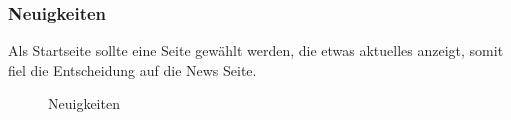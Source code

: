 \newpage
\FloatBarrier
\subsubsection{Neuigkeiten}\label{mockup_news}
Als Startseite sollte eine Seite gewählt werden, die etwas aktuelles anzeigt, somit fiel die Entscheidung auf die News Seite.
\begin{figure}[ht]
\centering
{}
\label{fig:mockup_news}
\caption{Neuigkeiten}
\end{figure}

